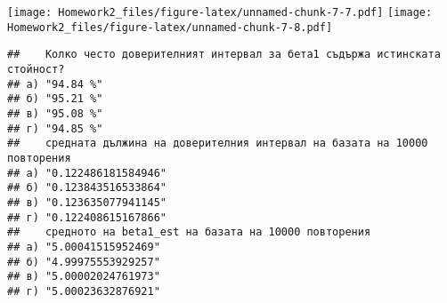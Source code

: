 \documentclass[
]{article}
\begin{document}
\texttt{[image: Homework2\_files/figure-latex/unnamed-chunk-7-7.pdf]}
\texttt{[image: Homework2\_files/figure-latex/unnamed-chunk-7-8.pdf]}

\begin{verbatim}
##    Колко често доверителният интервал за бета1 съдържа истинската стойност?
## а) "94.84 %"                                                               
## б) "95.21 %"                                                               
## в) "95.08 %"                                                               
## г) "94.85 %"                                                               
##    средната дължина на доверителния интервал на базата на 10000 повторения
## а) "0.122486181584946"                                                    
## б) "0.123843516533864"                                                    
## в) "0.123635077941145"                                                    
## г) "0.122408615167866"                                                    
##    средното на beta1_est на базата на 10000 повторения
## а) "5.00041515952469"                                 
## б) "4.99975553929257"                                 
## в) "5.00002024761973"                                 
## г) "5.00023632876921"
\end{verbatim}
\end{document}
